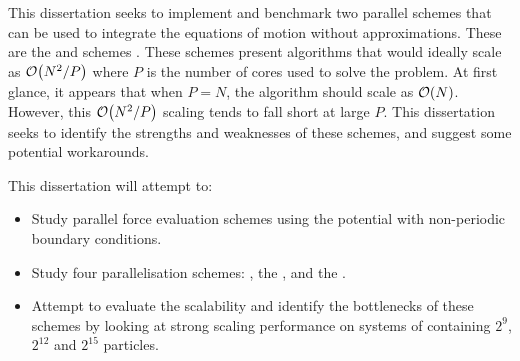 %
This dissertation seeks to implement and benchmark two parallel schemes
that can be used to integrate the equations of motion without
approximations.
%
These are the \replicateddata{} and \systolicloop{} schemes
\cite{smith1991molecular}.
%
These schemes present algorithms that would ideally scale as $\mathcal{O}{\left({ N^2/P }\right)}$
where $P$ is the number of cores used to solve the problem.
%
At first glance, it appears that when $P = N$, the algorithm should
scale as $\mathcal{O}{\left({ N }\right)}$.
%
However, this $\mathcal{O}{\left({ N^2/P }\right)}$ scaling tends to fall short at large $P$.
%
This dissertation seeks to identify the strengths and weaknesses of
these schemes, and suggest some potential workarounds.


%
This dissertation will attempt to:
\begin{itemize}
\item
    Study parallel force evaluation schemes using
    the \twobody{} \LennardJones{} potential with
    non-periodic boundary conditions.

\item
    Study four parallelisation schemes:
    \replicateddata{}, the \systolicloop{},
    \sharedandreplicateddata{} and the \replicatedsystolicloop{}.

\item
    Attempt to evaluate the scalability and
    identify the bottlenecks of these schemes
    by looking at strong scaling performance
    on systems of containing
    $2^{9}$, $2^{12}$ and $2^{15}$ particles.
\end  {itemize}
